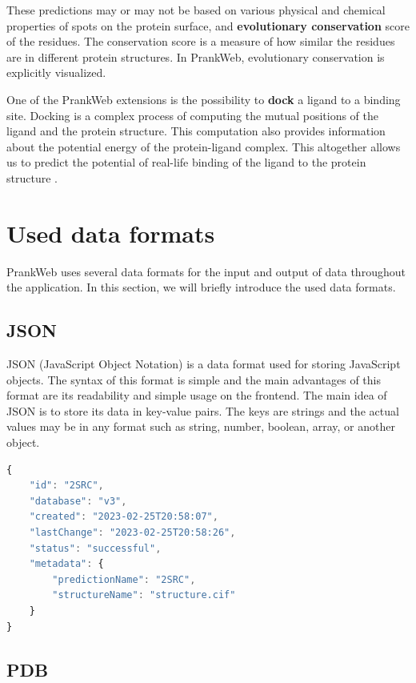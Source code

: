These predictions may or may not be based on various physical and chemical properties of spots on the protein surface, and \textbf{evolutionary conservation} score of the residues. The conservation score is a measure of how similar the residues are in different protein structures. In PrankWeb, evolutionary conservation is explicitly visualized.

One of the PrankWeb extensions is the possibility to \textbf{dock} a ligand to a binding site. Docking is a complex process of computing the mutual positions of the ligand and the protein structure. This computation also provides information about the potential energy of the protein-ligand complex. This altogether allows us to predict the potential of real-life binding of the ligand to the protein structure \cite{sulimov2019advances}.

\section{Used data formats}
\label{sec:used_data_formats}

PrankWeb uses several data formats for the input and output of data throughout the application. In this section, we will briefly introduce the used data formats.

\subsection{JSON}
\label{subsec:json}

JSON (JavaScript Object Notation) is a data format used for storing JavaScript objects. The syntax of this format is simple and the main advantages of this format are its readability and simple usage on the frontend. The main idea of JSON is to store its data in key-value pairs. The keys are strings and the actual values may be in any format such as string, number, boolean, array, or another object.

\begin{lstlisting}[language=JavaScript,caption={
    An example of a JSON file used for storing information about the prediction for the 2SRC protein structure.
}]
{
    "id": "2SRC",
    "database": "v3",
    "created": "2023-02-25T20:58:07",
    "lastChange": "2023-02-25T20:58:26",
    "status": "successful",
    "metadata": {
        "predictionName": "2SRC",
        "structureName": "structure.cif"
    }
}
\end{lstlisting}


\subsection{PDB}
\label{subsec:PDB}

